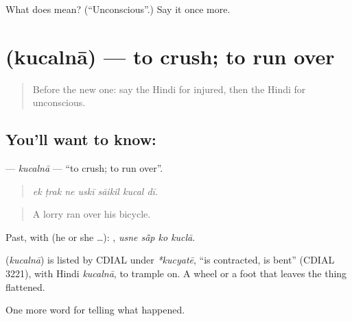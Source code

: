 \begin{tcolorbox}[breakable,colback=teal!4,colframe=teal!35!black,title={Before you move on}]
What does  mean? (\textquotedblleft{}Unconscious\textquotedblright{}.) Say it once more.
\end{tcolorbox}
\section[\texorpdfstring{\hi{कुचलना} (kucalnā)}{कुचलना (kucalnā)}]{ (kucalnā) — to crush; to run over}

\label{lesson:HI-C298-kucalna}



\begin{quote}
Before the new one: say the Hindi for injured, then the Hindi for unconscious.
\end{quote}

\subsection*{You'll want to know: }
\textbf{} — \emph{kucalnā} — \textquotedblleft{}to crush; to run over\textquotedblright{}.

\begin{quote}
      
\end{quote}

\begin{quote}
\emph{ek ṭrak ne uskī sāikil kucal dī.}
\end{quote}

\begin{quote}
A lorry ran over his bicycle.
\end{quote}

Past, with  (he or she …):    , \emph{usne sā̃p ko kuclā}.

\begin{cousinweb}
\textbf{} (\emph{kucalnā}) is listed by CDIAL under \emph{*kucyatē}, \textquotedblleft{}is contracted, is bent\textquotedblright{} (CDIAL 3221), with Hindi \emph{kucalnā}, to trample on. A wheel or a foot that \textbf{ } leaves the thing flattened.
\end{cousinweb}

\begin{grammarlens}[title={What you've built}]
One more word for telling what happened.
\end{grammarlens}

